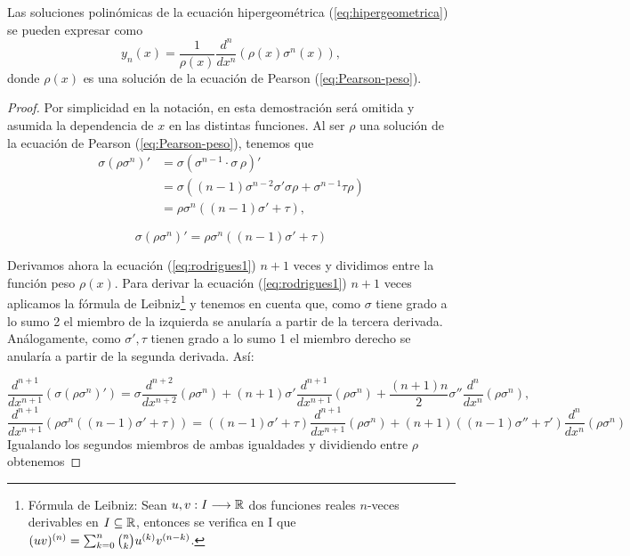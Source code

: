 \begin{teorema}
    Las soluciones polinómicas de la ecuación hipergeométrica (\ref{eq:hipergeometrica}) se pueden expresar como
    \begin{equation}
        \label{eq:formula-rodrigues}
        y_n(x) = \dfrac 1 {\rho(x)} \dfrac{d^n}{dx^n} (\rho(x) \sigma^n(x)),
    \end{equation}
    donde $\rho(x)$ es una solución de la ecuación de Pearson (\ref{eq:Pearson-peso}).
\end{teorema}
\begin{proof}
    Por simplicidad en la notación, en esta demostración será omitida y asumida la dependencia de $x$ en las distintas funciones.
    Al ser $\rho$ una solución de la ecuación de Pearson (\ref{eq:Pearson-peso}), tenemos que
    \begin{equation*}
        \begin{split}
            \sigma(\rho \sigma^n)' &= \sigma (\sigma^{n-1}\cdot \sigma \, \rho )' \\
            &= \sigma ((n-1)\sigma^{n-2}\sigma'\sigma\rho + \sigma^{n-1}\tau\rho) \\
            &= \rho \sigma^n ((n-1)\sigma'+\tau),
        \end{split}
    \end{equation*}

    \begin{equation}
        \label{eq:rodrigues1}
        \sigma(\rho \sigma^n)'=\rho \sigma^n ((n-1)\sigma'+\tau)
    \end{equation}

    Derivamos ahora la ecuación (\ref{eq:rodrigues1}) $n+1$ veces y dividimos entre la función peso $\rho(x)$. Para derivar la ecuación (\ref{eq:rodrigues1}) $n+1$ veces aplicamos la fórmula de Leibniz\footnote{Fórmula de Leibniz: Sean $u,v:I\longrightarrow\mathbb{R}$ dos funciones reales $n$-veces derivables en $I\subseteq\mathbb{R}$, entonces se verifica en I que $(uv)^{(n)}=\nolinebreak\sum_{k=0}^n \binom{n}{k} u^{(k)}v^{(n-k)}$.} y tenemos en cuenta que, como $\sigma$ tiene grado a lo sumo 2 el miembro de la izquierda se anularía a partir de la tercera derivada. Análogamente, como $\sigma',\tau$ tienen grado a lo sumo 1 el miembro derecho se anularía a partir de la segunda derivada. Así:

    $$
    \frac{d^{n+1}}{d x^{n+1}}\left(\sigma(\rho \sigma^n)'\right)= \sigma \frac{d^{n+2}}{d x^{n+2}} \left(\rho\sigma^n\right) + (n+1)\sigma'\frac{d^{n+1}}{d x^{n+1}} \left(\rho\sigma^n \right) + \frac{(n+1)n}{2}\sigma''\frac{d^{n}}{d x^{n}} \left(\rho\sigma^n \right),
    $$
    $$
    \frac{d^{n+1}}{d x^{n+1}}\left(\rho \sigma^n ((n-1)\sigma'+\tau)\right) = ((n-1)\sigma'+\tau)\frac{d^{n+1}}{d x^{n+1}}\left(\rho\sigma^n \right) + (n+1)\left((n-1)\sigma'' + \tau'\right)\frac{d^{n}}{d x^{n}}\left(\rho\sigma^n \right)
    $$
    Igualando los segundos miembros de ambas igualdades y dividiendo entre $\rho$ obtenemos


\end{proof}
